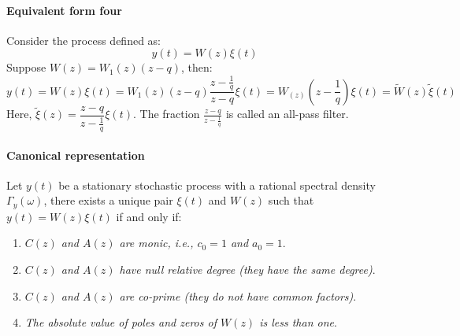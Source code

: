 \paragraph*{Equivalent form four}
Consider the process defined as:
\[y(t)=W(z)\xi(t)\]
Suppose $W(z)=W_1(z)(z-q)$, then:
\[y(t)=W(z)\xi(t)=W_1(z)(z-q)\dfrac{z-\frac{1}{q}}{z-q}\xi(t)=W_(z)\left(z-\dfrac{1}{q}\right)\xi(t)=\tilde{W}(z)\tilde{\xi}(t)\]
Here, $\tilde{\xi}(z)=\dfrac{z-q}{z-\frac{1}{q}}\xi(t)$. 
The fraction $\frac{z-q}{z-\frac{1}{q}}$ is called an all-pass filter.

\paragraph*{Canonical representation}
\begin{theorem}
    Let $y(t)$ be a stationary stochastic process with a rational spectral density $\Gamma_y(\omega)$, there exists a unique pair $\xi(t)$ and $W(z)$ such that $y(t)=W(z)\xi(t)$ if and only if:
\end{theorem}
\begin{enumerate}
    \item \textit{$C(z)$ and $A(z)$ are monic, i.e., $c_0=1$ and $a_0=1$}. 
    \item \textit{$C(z)$ and $A(z)$ have null relative degree (they have the same degree)}.
    \item \textit{$C(z)$ and $A(z)$ are co-prime (they do not have common factors)}.
    \item \textit{The absolute value of poles and zeros of $W(z)$ is less than one}.
\end{enumerate}